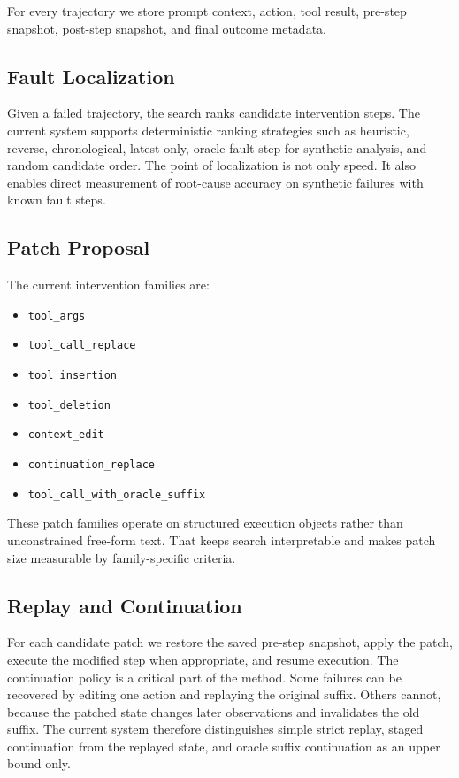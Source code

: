 \documentclass[11pt]{article}
\begin{document}
For every trajectory we store prompt context, action, tool result, pre-step
snapshot, post-step snapshot, and final outcome metadata.

\subsection{Fault Localization}

Given a failed trajectory, the search ranks candidate intervention steps. The
current system supports deterministic ranking strategies such as heuristic,
reverse, chronological, latest-only, oracle-fault-step for synthetic analysis,
and random candidate order. The point of localization is not only speed. It
also enables direct measurement of root-cause accuracy on synthetic failures
with known fault steps.

\subsection{Patch Proposal}

The current intervention families are:
\begin{itemize}
  \item \texttt{tool\_args}
  \item \texttt{tool\_call\_replace}
  \item \texttt{tool\_insertion}
  \item \texttt{tool\_deletion}
  \item \texttt{context\_edit}
  \item \texttt{continuation\_replace}
  \item \texttt{tool\_call\_with\_oracle\_suffix}
\end{itemize}

These patch families operate on structured execution objects rather than
unconstrained free-form text. That keeps search interpretable and makes patch
size measurable by family-specific criteria.

\subsection{Replay and Continuation}

For each candidate patch we restore the saved pre-step snapshot, apply the
patch, execute the modified step when appropriate, and resume execution. The
continuation policy is a critical part of the method. Some failures can be
recovered by editing one action and replaying the original suffix. Others
cannot, because the patched state changes later observations and invalidates
the old suffix. The current system therefore distinguishes simple strict
replay, staged continuation from the replayed state, and oracle suffix
continuation as an upper bound only.
\end{document}
